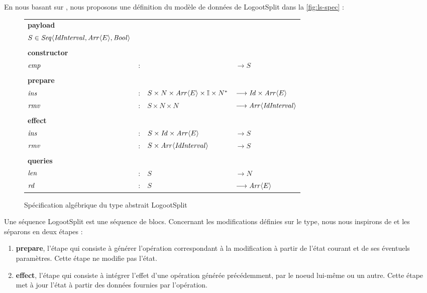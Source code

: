 En nous basant sur \textcite{2013-logootsplit}, nous proposons une définition du modèle de données de LogootSplit dans la \autoref{fig:ls-spec} :

\begin{figure}[!ht]
  \centering
    \begin{tabular}{llll}
      \textbf{payload} \\
      $S \in \mathit{Seq}\langle \mathit{IdInterval},\mathit{Arr}\langle E \rangle, \mathit{Bool} \rangle$ \\
      \\
      \textbf{constructor} \\
      $\mathit{emp}$ & : &                                                 & $\longrightarrow S$   \\
      \\
      \textbf{prepare} \\
      $\mathit{ins}$ & : & $S \times N \times \mathit{Arr}\langle E \rangle \times \mathbb{I} \times N^*$   & $\longrightarrow \mathit{Id} \times \mathit{Arr}\langle E \rangle$   \\
      $\mathit{rmv}$ & : & $S \times N \times N$                           & $\longrightarrow \mathit{Arr}\langle \mathit{IdInterval} \rangle$ \\
      \\
      \textbf{effect} \\
      $\mathit{ins}$ & : & $S \times \mathit{Id} \times \mathit{Arr}\langle E \rangle$ & $\longrightarrow S$ \\
      $\mathit{rmv}$ & : & $S \times \mathit{Arr}\langle \mathit{IdInterval} \rangle$  & $\longrightarrow S$ \\
      \\
      \textbf{queries} \\
      $\mathit{len}$ & : & $S$                                             & $\longrightarrow N$   \\
      $\mathit{rd}$  & : & $S$                                             & $\longrightarrow \mathit{Arr}\langle E \rangle$ \\
    \end{tabular}
  \caption{Spécification algébrique du type abstrait LogootSplit}
  \label{fig:ls-spec}
\end{figure}

Une séquence LogootSplit est une séquence de blocs.
Concernant les modifications définies sur le type, nous nous inspirons de \cite{baquero2017pure} et les séparons en deux étapes :
\begin{enumerate}
  \item \textbf{prepare}, l'étape qui consiste à générer l'opération correspondant à la modification à partir de l'état courant et de ses éventuels paramètres.
    Cette étape ne modifie pas l'état.
  \item \textbf{effect}, l'étape qui consiste à intégrer l'effet d'une opération générée précédemment, par le noeud lui-même ou un autre.
    Cette étape met à jour l'état à partir des données fournies par l'opération.
\end{enumerate}

